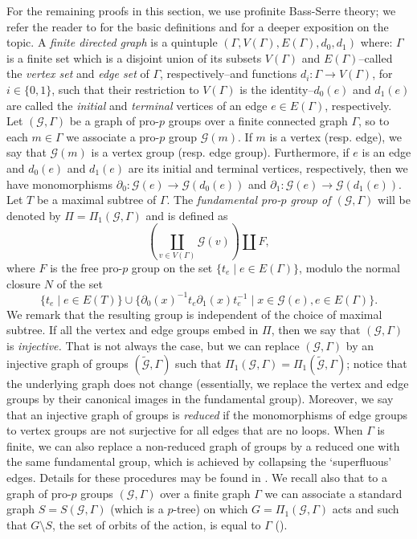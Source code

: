 \documentclass[a4paper,10pt]{amsart}
\theoremstyle{plain}
\theoremstyle{definition}
\numberwithin{equation}{section}
\begin{document}
For the remaining proofs in this section, we use profinite Bass-Serre theory; we refer the reader to \cite{R17} for the basic definitions and for a deeper exposition on the topic. A \emph{finite directed graph} is a quintuple $(\Gamma, V(\Gamma), E(\Gamma), d_0,d_1)$ where: $\Gamma$ is a finite set which is a disjoint union of its subsets $V(\Gamma)$ and $E(\Gamma)$--called the \emph{vertex set} and \emph{edge set} of $\Gamma$, respectively--and functions $d_i \colon \Gamma \to V(\Gamma)$, for $i \in \{0,1\}$, such that their restriction to $V(\Gamma)$ is the identity--$d_0(e)$ and $d_1(e)$ are called the \emph{initial} and \emph{terminal} vertices of an edge $e \in E(\Gamma)$, respectively.
Let $(\mathcal G, \Gamma)$ be a graph of pro-$p$ groups over a finite connected graph $\Gamma$, so to each $m \in \Gamma$ we associate a pro-$p$ group $\mathcal G(m)$. If $m$ is a vertex (resp. edge), we say that $\mathcal G(m)$ is a vertex group (resp. edge group). Furthermore, if $e$ is an edge and $d_0(e)$ and $d_1(e)$ are its initial and terminal vertices, respectively, then we have monomorphisms $\partial_0 \colon\mathcal G(e) \to \mathcal G(d_0(e))$ and $\partial_1 \colon \mathcal G(e) \to \mathcal G(d_1(e))$. Let $T$ be a maximal subtree of $\Gamma$. The \emph{fundamental pro-$p$ group of $(\mathcal G,\Gamma)$} will be denoted by $\Pi=\Pi_1(\mathcal G, \Gamma)$ and is defined as
\[\left( \coprod_{v \in V(\Gamma)} \mathcal G(v) \right) \amalg F,\]
where $F$ is the free pro-$p$ group on the set $\{t_e \mid e \in E(\Gamma)\}$, modulo the normal closure $N$ of the set
\[\{t_e \mid e \in E(T)\} \cup \{\partial_0(x)^{-1}  t_e\partial_1(x)t_e^{-1} \mid x \in \mathcal G(e), e\in E(\Gamma)\}.\]
We remark that the resulting group is independent of the choice of maximal subtree. If all the vertex and edge groups embed in $\Pi$, then we say that $(\mathcal G, \Gamma)$ is \emph{injective.} That is not always the case, but we can replace $(\mathcal G,\Gamma)$ by an injective graph of groups $(\tilde{\mathcal G},\Gamma)$ such that $\Pi_1(\mathcal G, \Gamma)=\Pi_1(\tilde{\mathcal G},\Gamma)$; notice that the underlying graph does not change (essentially, we replace the vertex and edge groups by their canonical images in the fundamental group). Moreover, we say that an injective graph of groups is \emph{reduced} if the monomorphisms of edge groups to vertex groups are not surjective for all edges that are no loops. When $\Gamma$ is finite, we can also replace a non-reduced graph of groups by a reduced one with the same fundamental group, which is achieved by collapsing the `superfluous' edges. Details for these procedures may be found in \cite[Sections 6.4, 7.2]{R17}. We recall also that to a graph of pro-$p$ groups $(\mathcal G,\Gamma)$ over a finite graph $\Gamma$ we can associate a standard graph $S=S(\mathcal G,\Gamma)$ (which is a $p$-tree) on which $G=\Pi_1(\mathcal G,\Gamma)$ acts and such that $G\setminus S$, the set of orbits of the action, is equal to $\Gamma$ (\cite[Section 6.3]{R17}).
\end{document}
